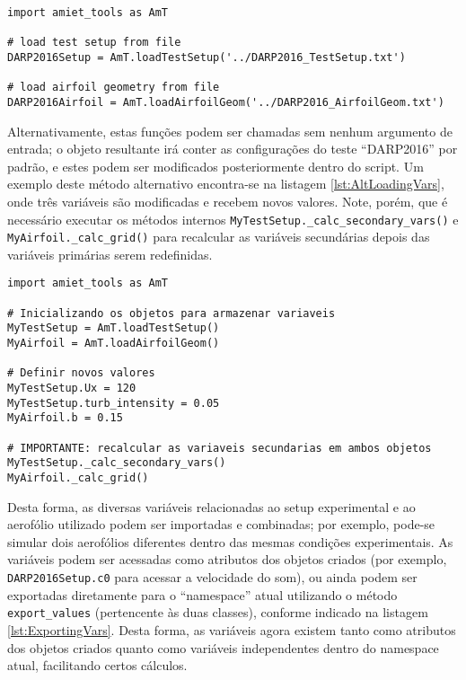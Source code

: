 \documentclass[a4paper, 11pt, twoside]{article}
\begin{document}
\begin{lstlisting}[caption={Importando pacotes e carregando variáveis},label={lst:LoadingVars}]
import amiet_tools as AmT

# load test setup from file
DARP2016Setup = AmT.loadTestSetup('../DARP2016_TestSetup.txt')

# load airfoil geometry from file
DARP2016Airfoil = AmT.loadAirfoilGeom('../DARP2016_AirfoilGeom.txt')
\end{lstlisting}

Alternativamente, estas funções podem ser chamadas sem nenhum argumento de entrada; o objeto resultante irá conter as configurações do teste ``DARP2016'' por padrão, e estes podem ser modificados posteriormente dentro do script. Um exemplo deste método alternativo encontra-se na listagem \ref{lst:AltLoadingVars}, onde três variáveis são modificadas e recebem novos valores. Note, porém, que é necessário executar os métodos internos \verb|MyTestSetup._calc_secondary_vars()| e \verb|MyAirfoil._calc_grid()| para recalcular as variáveis secundárias depois das variáveis primárias serem redefinidas.

\begin{lstlisting}[caption={Método alternativo para carregar variáveis},label={lst:AltLoadingVars}]
import amiet_tools as AmT

# Inicializando os objetos para armazenar variaveis
MyTestSetup = AmT.loadTestSetup()
MyAirfoil = AmT.loadAirfoilGeom()

# Definir novos valores
MyTestSetup.Ux = 120
MyTestSetup.turb_intensity = 0.05
MyAirfoil.b = 0.15

# IMPORTANTE: recalcular as variaveis secundarias em ambos objetos
MyTestSetup._calc_secondary_vars()
MyAirfoil._calc_grid()
\end{lstlisting}

Desta forma, as diversas variáveis relacionadas ao setup experimental e ao aerofólio utilizado podem ser importadas e combinadas; por exemplo, pode-se simular dois aerofólios diferentes dentro das mesmas condições experimentais. As variáveis podem ser acessadas como atributos dos objetos criados (por exemplo, \verb|DARP2016Setup.c0| para acessar a velocidade do som), ou ainda podem ser exportadas diretamente para o ``namespace'' atual utilizando o método \verb|export_values| (pertencente às duas classes), conforme indicado na listagem \ref{lst:ExportingVars}. Desta forma, as variáveis agora existem tanto como atributos dos objetos criados quanto como variáveis independentes dentro do namespace atual, facilitando certos cálculos.
\end{document}
